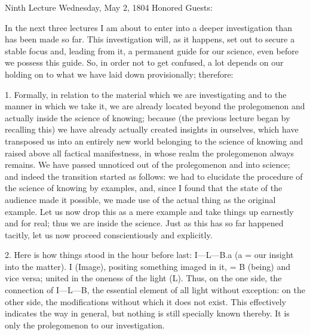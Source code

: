 Ninth Lecture
Wednesday, May 2, 1804
Honored Guests:

In the next three lectures I am about to enter
into a deeper investigation than has been made so far.
This investigation will, as it happens,
set out to secure a stable focus
and, leading from it, a permanent guide for our science,
even before we possess this guide.
So, in order not to get confused, a lot depends
on our holding on to what we have laid down provisionally;
therefore:

1. Formally, in relation to the material
which we are investigating
and to the manner in which we take it,
we are already located beyond the prolegomenon
and actually inside the science of knowing;
because (the previous lecture began by recalling this)
we have already actually created insights in ourselves,
which have transposed us into an entirely new world
belonging to the science of knowing
and raised above all factical manifestness,
in whose realm the prolegomenon always remains.
We have passed unnoticed out of
the prolegomenon and into science;
and indeed the transition started as follows:
we had to elucidate the procedure of
the science of knowing by examples,
and, since I found that the state of
the audience made it possible,
we made use of the actual thing
as the original example.
Let us now drop this as a mere example
and take things up earnestly and for real;
thus we are inside the science.
Just as this has so far happened tacitly,
let us now proceed conscientiously and explicitly.

2. Here is how things stood in the hour before last:
I—L—B.a (a = our insight into the matter).
I (Image), positing something imaged in it,
= B (being) and vice versa;
united in the oneness of the light (L).
Thus, on the one side,
the connection of I—L—B,
the essential element of all light without exception:
on the other side, the modifications
without which it does not exist.
This effectively indicates the way in general,
but nothing is still specially known thereby.
It is only the prolegomenon to our investigation.

